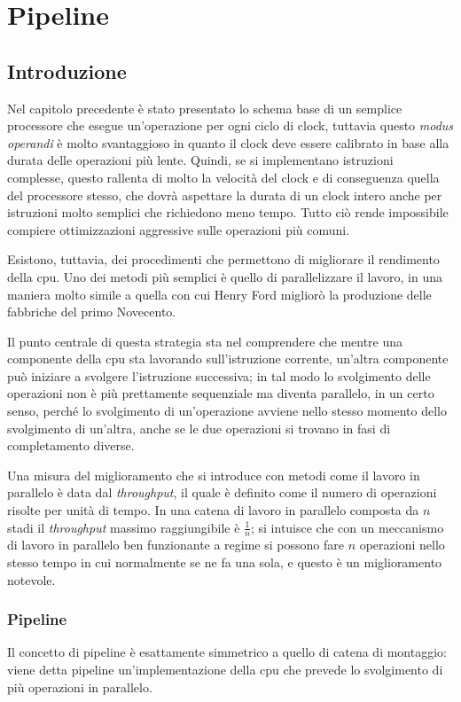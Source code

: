 \documentclass[class=book, crop=false, oneside]{standalone}
\begin{document}
\chapter{Pipeline}

\section{Introduzione}
Nel capitolo precedente è stato presentato lo schema base di un semplice processore che esegue un'operazione per ogni ciclo di clock, tuttavia questo \emph{modus operandi} è molto svantaggioso in quanto il clock deve essere calibrato in base alla durata delle operazioni più lente. Quindi, se si implementano istruzioni complesse, questo rallenta di molto la velocità del clock e di conseguenza quella del processore stesso, che dovrà aspettare la durata di un clock intero anche per istruzioni molto semplici che richiedono meno tempo. Tutto ciò rende impossibile compiere ottimizzazioni aggressive sulle operazioni più comuni.

Esistono, tuttavia, dei procedimenti che permettono di migliorare il rendimento della \acrshort{cpu}.
Uno dei metodi più semplici è quello di parallelizzare il lavoro, in una maniera molto simile a quella con cui Henry Ford migliorò la produzione delle fabbriche del primo Novecento.

Il punto centrale di questa strategia sta nel comprendere che mentre una componente della \acrshort{cpu} sta lavorando sull'istruzione corrente, un'altra componente può iniziare a svolgere l'istruzione successiva; in tal modo lo svolgimento delle operazioni non è più prettamente sequenziale ma diventa parallelo, in un certo senso, perché lo svolgimento di un'operazione avviene nello stesso momento dello svolgimento di un'altra, anche se le due operazioni si trovano in fasi di completamento diverse.

Una misura del miglioramento che si introduce con metodi come il lavoro in parallelo è data dal \emph{throughput}, il quale è definito come il numero di operazioni risolte per unità di tempo. In una catena di lavoro in parallelo composta da \(n\) stadi il \emph{throughput} massimo raggiungibile è \(\frac{1}{n}\); si intuisce che con un meccanismo di lavoro in parallelo ben funzionante a regime si possono fare \(n\) operazioni nello stesso tempo in cui normalmente se ne fa una sola, e questo è un miglioramento notevole.

\subsection*{Pipeline}
Il concetto di pipeline è esattamente simmetrico a quello di catena di montaggio: viene detta pipeline un'implementazione della \acrshort{cpu} che prevede lo svolgimento di più operazioni in parallelo.
\end{document}
